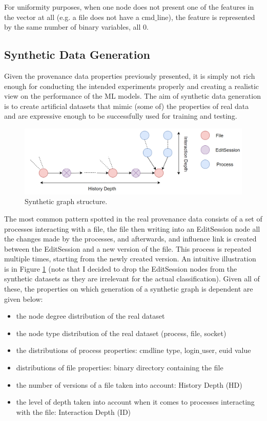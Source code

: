 For uniformity purposes, when one node does not present one of the features in the vector at all (e.g. a file does not have a cmd$\_$line), the feature is represented by the same number of binary variables, all 0. 

\subsection{Synthetic Data Generation} \label{Synthetic Data Generation}

Given the provenance data properties previously presented, it is simply not rich enough for conducting the intended experiments properly and creating a realistic view on the performance of the ML models. The aim of synthetic data generation is to create artificial datasets that mimic (some of) the properties of real data and are expressive enough to be successfully used for training and testing. \\

\begin{figure}[H]
  \centering
  \centerline{\includegraphics[scale = 0.35]{Images/synth_dataset.png}}
  \caption{Synthetic graph structure.}
  \label{synth_dataset}
\end{figure}

The most common pattern spotted in the real provenance data consists of a set of processes interacting with a file, the file then writing into an EditSession node all the changes made by the processes, and afterwards, and influence link is created between the EditSession and a new version of the file. This process is repeated multiple times, starting from the newly created version. An intuitive illustration is in Figure \ref{synth_dataset} (note that I decided to drop the EditSession nodes from the synthetic datasets as they are irrelevant for the actual classification). Given all of these, the properties on which generation of a synthetic graph is dependent are given below:

\begin{itemize}
    \item the node degree distribution of the real dataset
    \item the node type distribution of the real dataset (process, file, socket)
    \item the distributions of process properties: cmdline type, login$\_$user, euid value
    \item distributions of file properties: binary directory containing the file
    \item the number of versions of a file taken into account: History Depth (HD)
    \item the level of depth taken into account when it comes to processes interacting with the file: Interaction Depth (ID)
\end{itemize}

